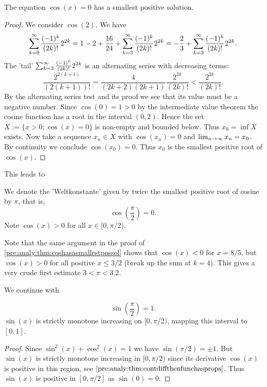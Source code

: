 \documentclass[10pt, a4paper]{article}
\newcommand{\infsumo}[1][k = 0]{\sum_{#1}^{\infty}}
\begin{document}
\begin{theorem}\label{pre:analy:thm:coshasasmallestpossol}
    The equation $\cos(x) = 0$ has a smallest positive solution.
    \begin{proof}
        We consider $\cos(2)$.
        We have
        \[
        \infsumo\frac{(-1) ^ k}{(2k)!}2 ^ {2k} = 1 - 2 + \frac{16}{24} + \infsum[k = 3]\frac{(-1) ^ k}{(2k)!}2 ^ {2k} = -\frac{2}{3} + \infsum[k = 3]\frac{(-1) ^ k}{(2k)!}2 ^ {2k}.
        \]
        The 'tail' $\infsum[k = 3]\frac{(-1) ^ k}{(2k)!}2 ^ {2k}$ is an alternating series with decreasing terms:
        \[
        \frac{2 ^ {2(k + 1)}}{(2(k + 1))!} = \frac{4}{(2k + 2)(2k + 1)}\frac{2 ^ {2k}}{(2k)!} < \frac{2 ^ {2k}}{(2k)!}.
        \]
        By the alternating series test and its proof we see that its value must be a negative number.
        Since $\cos(0) = 1 > 0$ by the intermediate value theorem the cosine function has a root in the interval $(0, 2)$.
        Hence the set $X := \{x > 0; \cos(x) = 0\}$ is non-empty and bounded below.
        Thus $x_0 = \inf{X}$ exists.
        Now take a sequence $x_n \in X$ with $\cos(x_n) = 0$ and $\liminfty x_n = x_0$.
        By continuity we conclude $\cos(x_0) = 0$.
        Thus $x_0$ is the smallest positive root of $\cos(x)$.
    \end{proof}
\end{theorem}

This leads to
\begin{definition}
    We denote the 'Weltkonstante' given by twice the smallest positive root of cosine by $\pi$,
    that is,
    \[
    \cos\left(\frac{\pi}{2}\right) = 0.
    \]
    Note $\cos(x) > 0$ for all $x \in [0, \pi / 2)$.
\end{definition}

Note that the same argument in the proof of \autoref{pre:analy:thm:coshasasmallestpossol} shows that $\cos(x) < 0$ for $x = 8 / 5$,
but $\cos(x) > 0$ for all positive $x \leq 3 / 2$
(break up the sum at $k = 4$).
This gives a very crude first estimate $3 < \pi < 3.2$.

We continue with
\begin{theorem}
    \[
    \sin\left(\frac{\pi}{2}\right) = 1.
    \]
    $\sin(x)$ is strictly monotone increasing on $[0, \pi / 2)$,
    mapping this interval to $[0, 1]$.
    \begin{proof}
        Since $\sin ^ 2(x) + \cos ^ 2(x) = 1$ we have $\sin(\pi / 2) = \pm 1$.
        But $\sin(x)$ is strictly monotone increasing in $[0, \pi / 2)$ since its derivative $\cos(x)$ is positive in this region,
        see $\autoref{pre:analy:thm:contdiffthenfunchasprops}$.
        Thus $\sin(x)$ is positive in $[0, \pi / 2]$ as $\sin(0) = 0$.
    \end{proof}
\end{theorem}
\end{document}
